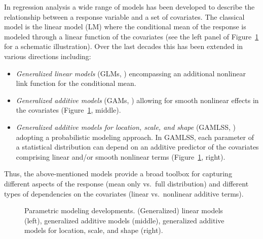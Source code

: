 \documentclass[aoas, preprint]{imsart}
\numberwithin{equation}{subsection}
\begin{document}
In regression analysis a wide range of models has been developed to describe the
relationship between a response variable and a set of covariates. The classical
model is the linear model (LM) where the conditional mean of the response
is modeled through a linear function of the covariates (see the left panel of
Figure~\ref{fig:gam} for a schematic illustration). Over the last decades
this has been extended in various directions including:


\begin{itemize}
  \item \emph{Generalized linear models} (GLMs, \citealp{Nelder+Wedderburn:1972})
    encompassing an additional nonlinear link function for the conditional mean.
  \item \emph{Generalized additive models} (GAMs, \citealp{Hastie+Tibshirani:1986})
    allowing for smooth nonlinear effects in the covariates
    (Figure~\ref{fig:gam}, middle).
  \item \emph{Generalized additive models for location, scale, and shape}
    (GAMLSS, \citealp{Rigby+Stasinopoulos:2005}) adopting a probabilistic modeling
    approach. In GAMLSS, each parameter of a statistical distribution can depend
    on an additive predictor of the covariates comprising linear and/or
    smooth nonlinear terms (Figure~\ref{fig:gam}, right).
\end{itemize}
Thus, the above-mentioned models provide a broad toolbox for capturing different
aspects of the response (mean only vs.\ full distribution) and different types
of dependencies on the covariates (linear vs.\ nonlinear additive terms).

\begin{figure}[t!]
\caption{\label{fig:gam}Parametric modeling developments. (Generalized) linear models (left),
generalized additive models (middle), generalized additive models for location, scale, and shape (right).}
\end{figure}
\end{document}
